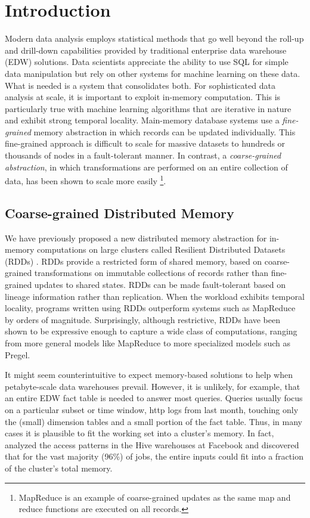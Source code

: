 
\section{Introduction}

Modern data analysis employs statistical methods that go well beyond the roll-up and drill-down capabilities provided by traditional enterprise data warehouse (EDW) solutions. Data scientists appreciate the ability to use SQL for simple data manipulation but rely on other systems for machine learning on these data. What is needed is a system that consolidates both. For sophisticated data analysis at scale, it is important to exploit in-memory computation.  This is particularly true with machine learning algorithms that are iterative in nature and exhibit strong temporal locality. Main-memory database systems use a \emph{fine-grained} memory abstraction in which records can be updated individually. This fine-grained approach is difficult to scale for massive datasets to hundreds or thousands of nodes in a fault-tolerant manner. In contrast, a \emph{coarse-grained abstraction}, in which transformations are performed on an entire collection of data, has been shown to scale more easily
\footnote{MapReduce is an example of coarse-grained updates as the same map and reduce functions are executed on all records.}.

\subsection{Coarse-grained Distributed Memory}
We have previously proposed a new distributed memory abstraction for in-memory computations on large clusters called Resilient Distributed Datasets (RDDs) \cite{spark-tr}. RDDs provide a restricted form of shared memory, based on coarse-grained transformations on immutable collections of records rather than fine-grained updates to shared states. RDDs can be made fault-tolerant based on lineage information rather than replication. When the workload exhibits temporal locality, programs written using RDDs outperform systems such as MapReduce by orders of magnitude. Surprisingly, although restrictive, RDDs have been shown to be expressive enough to capture a wide class of computations, ranging from more general models like MapReduce to more specialized models such as Pregel.

It might seem counterintuitive to expect memory-based solutions to help when petabyte-scale data warehouses prevail. However, it is unlikely, for example, that an entire EDW fact table is needed to answer most queries. Queries usually focus on a particular subset or time window, \eg http logs from last month, touching only the (small) dimension tables and a small portion of the fact table. Thus, in many cases it is plausible to fit the working set into a cluster's memory. In fact, \cite{memento-hotos} analyzed the access patterns in the Hive warehouses at Facebook and discovered that for the vast majority (96\%) of jobs, the entire inputs could fit into a fraction of the cluster's total memory.

